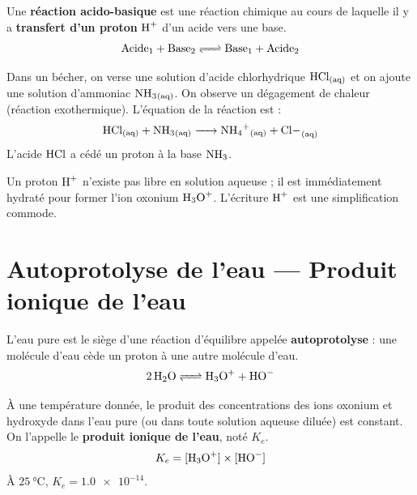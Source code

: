 \begin{definition}
Une \textbf{réaction acido-basique} est une réaction chimique au cours de laquelle il y a \textbf{transfert d'un proton} $\ce{H+}$ d'un acide vers une base.
\[
\ce{Acide1 + Base2 <=> Base1 + Acide2}
\]
\end{definition}

\begin{experience}
Dans un bécher, on verse une solution d'acide chlorhydrique $\ce{HCl_{(aq)}}$ et on ajoute une solution d'ammoniac $\ce{NH3_{(aq)}}$. On observe un dégagement de chaleur (réaction exothermique). L'équation de la réaction est :
\[
\ce{HCl_{(aq)} + NH3_{(aq)} -> NH4+_{(aq)} + Cl-_{(aq)}}
\]
L'acide $\ce{HCl}$ a cédé un proton à la base $\ce{NH3}$.
\end{experience}

\begin{remarque}
Un proton $\ce{H+}$ n'existe pas libre en solution aqueuse ; il est immédiatement hydraté pour former l'ion oxonium $\ce{H3O+}$. L'écriture $\ce{H+}$ est une simplification commode.
\end{remarque}

\section{Autoprotolyse de l'eau — Produit ionique de l'eau}

\begin{definition}
L'eau pure est le siège d'une réaction d'équilibre appelée \textbf{autoprotolyse} : une molécule d'eau cède un proton à une autre molécule d'eau.
\[
\ce{2 H2O <=> H3O+ + HO-}
\]
\end{definition}

\begin{loi}
À une température donnée, le produit des concentrations des ions oxonium et hydroxyde dans l'eau pure (ou dans toute solution aqueuse diluée) est constant. On l'appelle le \textbf{produit ionique de l'eau}, noté $K_e$.
\[
K_e = [\ce{H3O+}] \times [\ce{HO-}]
\]
À $\SI{25}{\celsius}$, $K_e = \num{1.0e-14}$.
\end{loi}

